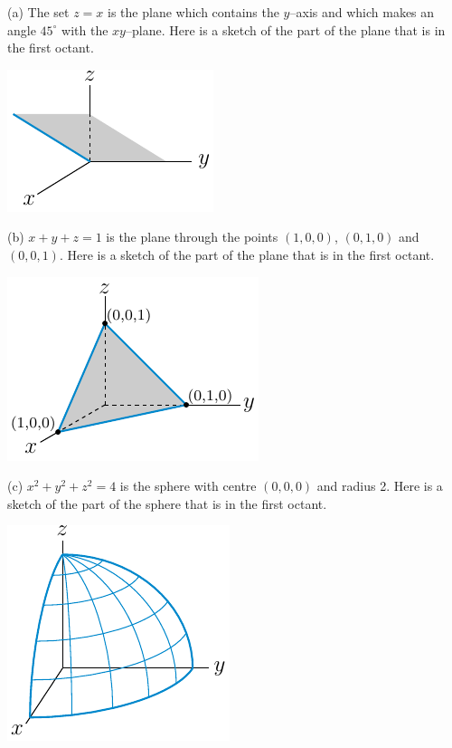\begin{answer}
(a)
The set $z=x$ is the plane which contains the $y$--axis and which  
makes an angle $45^\circ$ with the $xy$--plane. Here is a sketch 
of the part of the plane that is in the first octant.

\begin{center}
     \includegraphics{fig/xeqzPlane.pdf}
\end{center}


(b)
$x+y+z=1$ is the plane through the points $(1,0,0)$, $(0,1,0)$
and  $(0,0,1)$. Here is a sketch of the part of the plane 
that is in the first octant.

\begin{center}
     \includegraphics{fig/xyzPlane.pdf}
\end{center}


(c)
$x^2+y^2+z^2=4$ is the sphere with centre $(0,0,0)$ and radius 2.
Here is a sketch of the part of the sphere that is in the first octant.

\begin{center}
     \includegraphics{fig/quarterSphere.pdf}
\end{center}


\end{answer}
